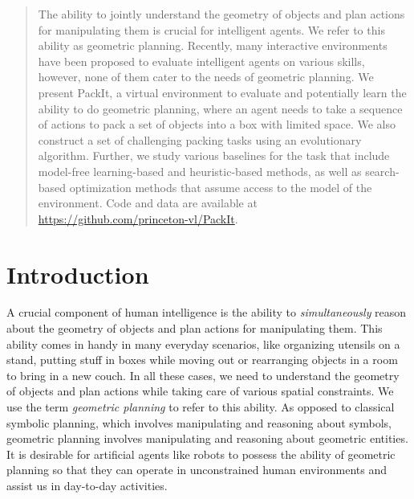 \documentclass{article}
\begin{document}

\printAffiliationsAndNotice{}  

\begin{abstract}
The ability to jointly understand the geometry of objects and plan actions for manipulating them is crucial for intelligent agents. We refer to this ability as geometric planning. Recently, many interactive environments have been proposed to evaluate intelligent agents on various skills, however, none of them cater to the needs of geometric planning. We present PackIt, a virtual environment to evaluate and potentially learn the ability to do geometric planning, where an agent needs to take a sequence of actions to pack a set of objects into a box with limited space. We also construct a set of challenging packing tasks using an evolutionary algorithm. Further, we study various baselines for the task that include model-free learning-based and heuristic-based methods, as well as search-based optimization methods that assume access to the model of the environment. Code and data are available at \url{https://github.com/princeton-vl/PackIt}.
\end{abstract}

\section{Introduction}
A crucial component of human intelligence is the ability to \textit{simultaneously} reason about the geometry of objects and plan actions for manipulating them. This ability comes in handy in many everyday scenarios, like organizing utensils on a stand, putting stuff in boxes while moving out or rearranging objects in a room to bring in a new couch. In all these cases, we need to understand the geometry of objects and plan actions while taking care of various spatial constraints. We use the term \textit{geometric planning} to refer to this ability. As opposed to classical symbolic planning, which involves manipulating and reasoning about symbols, geometric planning involves manipulating and reasoning about geometric entities. It is desirable for artificial agents like robots to possess the ability of geometric planning so that they can operate in unconstrained human environments and assist us in day-to-day activities.
\end{document}

